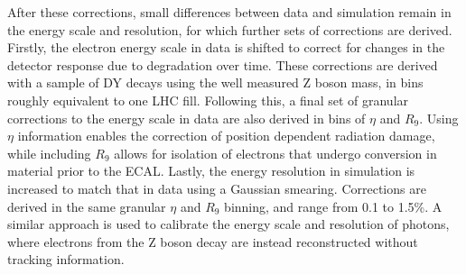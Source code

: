 After these corrections, small differences between data and simulation remain in the energy scale and resolution, for which further sets of corrections are derived. Firstly, the electron energy scale in data is shifted to correct for changes in the detector response due to degradation over time. These corrections are derived with a sample of DY \Zee decays using the well measured $\mathrm{Z}$ boson mass, in bins roughly equivalent to one LHC fill. 
Following this, a final set of granular corrections to the energy scale in data are also derived in bins of $\eta$ and $R_{9}$. Using $\eta$ information enables the correction of position dependent radiation damage, while including $R_{9}$ allows for isolation of electrons that undergo conversion in material prior to the ECAL. Lastly, the energy resolution in simulation is increased to match that in data using a Gaussian smearing. Corrections are derived in the same granular $\eta$ and $R_{9}$ binning, and range from 0.1 to 1.5\%. A similar approach is used to calibrate the energy scale and resolution of photons, where electrons from the $\mathrm{Z}$ boson decay are instead reconstructed without tracking information. 

